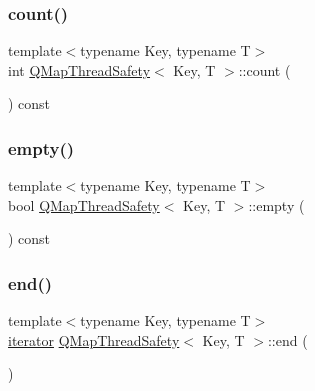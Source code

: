 \mbox{\label{class_q_map_thread_safety_a8adacf9b06525045bd79c909cea90f0a}} 
\subsubsection{\texorpdfstring{count()}{count()}\hspace{0.1cm}{\footnotesize\ttfamily [2/2]}}
{\footnotesize\ttfamily template$<$typename Key, typename T$>$ \\
int \hyperlink{class_q_map_thread_safety}{Q\+Map\+Thread\+Safety}$<$ Key, T $>$\+::count (\begin{DoxyParamCaption}{ }\end{DoxyParamCaption}) const\hspace{0.3cm}{\ttfamily [inline]}}

\mbox{\label{class_q_map_thread_safety_a5becb3980d1b35a27edde74f78ed43e2}} 
\subsubsection{\texorpdfstring{empty()}{empty()}}
{\footnotesize\ttfamily template$<$typename Key, typename T$>$ \\
bool \hyperlink{class_q_map_thread_safety}{Q\+Map\+Thread\+Safety}$<$ Key, T $>$\+::empty (\begin{DoxyParamCaption}{ }\end{DoxyParamCaption}) const\hspace{0.3cm}{\ttfamily [inline]}}

\mbox{\label{class_q_map_thread_safety_a64a700a04a692176f00e119500dd1b23}} 
\subsubsection{\texorpdfstring{end()}{end()}}
{\footnotesize\ttfamily template$<$typename Key, typename T$>$ \\
\hyperlink{class_q_map_thread_safety_a454c8af3f68e6d61aecaf1b918aa525b}{iterator} \hyperlink{class_q_map_thread_safety}{Q\+Map\+Thread\+Safety}$<$ Key, T $>$\+::end (\begin{DoxyParamCaption}{ }\end{DoxyParamCaption})\hspace{0.3cm}{\ttfamily [inline]}}



